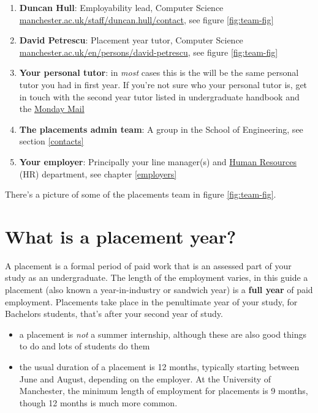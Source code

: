 \documentclass[
]{book}
\providecommand{\tightlist}{%
  \setlength{\itemsep}{0pt}\setlength{\parskip}{0pt}}
\begin{document}
\begin{enumerate}
\def\labelenumi{\arabic{enumi}.}
\tightlist
\item
  \textbf{Duncan Hull}: Employability lead, Computer Science \href{https://personalpages.manchester.ac.uk/staff/duncan.hull/contact}{manchester.ac.uk/staff/duncan.hull/contact}, see figure \ref{fig:team-fig}
\item
  \textbf{David Petrescu}: Placement year tutor, Computer Science \href{https://research.manchester.ac.uk/en/persons/david-petrescu}{manchester.ac.uk/en/persons/david-petrescu}, see figure \ref{fig:team-fig}
\item
  \textbf{Your personal tutor}: in \emph{most} cases this is the will be the same personal tutor you had in first year. If you're not sure who your personal tutor is, get in touch with the second year tutor listed in undergraduate handbook \citep{ughandbook} and the \href{https://studentnet.cs.manchester.ac.uk/ugt/mondaymail/}{Monday Mail} \citep{mondaymail}
\item
  \textbf{The placements admin team}: A group in the School of Engineering, see section \ref{contacts}
\item
  \textbf{Your employer}: Principally your line manager(s) and \href{https://en.wikipedia.org/wiki/Human_resources}{Human Resources} (HR) department, see chapter \ref{employers}
\end{enumerate}

There's a picture of some of the placements team in figure \ref{fig:team-fig}.

\section{What is a placement year?}\label{placement}

A placement is a formal period of paid work that is an assessed part of your study as an undergraduate. \citep{whatisie} The length of the employment varies, in this guide a placement (also known a year-in-industry or sandwich year) is a \textbf{full year} of paid employment. Placements take place in the penultimate year of your study, for Bachelors students, that's after your second year of study.

\begin{itemize}
\tightlist
\item
  a placement is \emph{not} a summer internship, although these are also good things to do and lots of students do them
\item
  the usual duration of a placement is 12 months, typically starting between June and August, depending on the employer. At the University of Manchester, the minimum length of employment for placements is 9 months, though 12 months is much more common.
\end{itemize}
\end{document}
